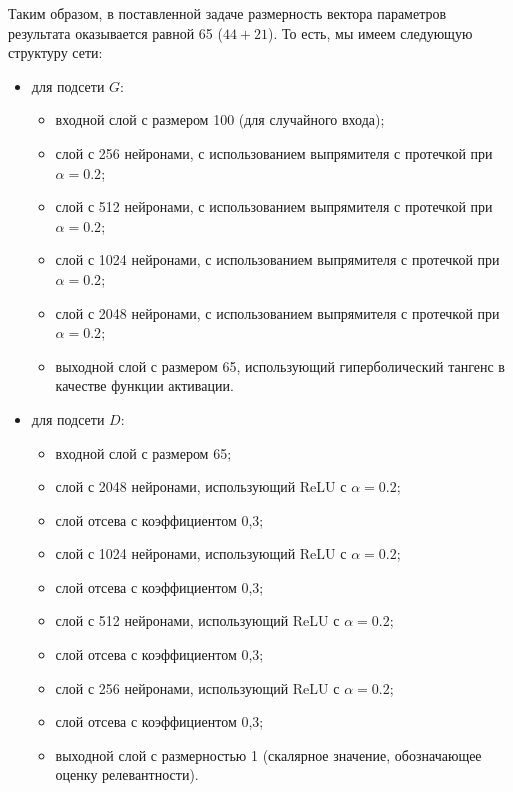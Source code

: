Таким образом, в поставленной задаче размерность вектора параметров результата оказывается равной 65 ($44+21$). То есть, мы имеем следующую
структуру сети:
\begin{itemize}
    \item для подсети $G$:
          \begin{itemize}
              \item входной слой с размером 100 (для случайного
                    входа);
              \item слой с 256 нейронами, с использованием выпрямителя с протечкой при $\alpha = 0.2$;
              \item слой с 512 нейронами, с использованием выпрямителя с протечкой при $\alpha = 0.2$;
              \item слой с 1024 нейронами, с использованием выпрямителя с протечкой при $\alpha = 0.2$;
              \item слой с 2048 нейронами, с использованием выпрямителя с протечкой при $\alpha = 0.2$;
              \item выходной слой с размером 65, использующий гиперболический тангенс в качестве функции активации.
          \end{itemize}
    \item для подсети $D$:
          \begin{itemize}
              \item входной слой с размером 65;
              \item слой с 2048 нейронами, использующий ReLU с $\alpha = 0.2$;
              \item слой отсева с коэффициентом 0,3;
              \item слой с 1024 нейронами, использующий ReLU с $\alpha = 0.2$;
              \item слой отсева с коэффициентом 0,3;
              \item слой с 512 нейронами, использующий ReLU с $\alpha = 0.2$;
              \item слой отсева с коэффициентом 0,3;
              \item слой с 256 нейронами, использующий ReLU с $\alpha = 0.2$;
              \item слой отсева с коэффициентом 0,3;
              \item выходной слой с размерностью 1 (скалярное значение, обозначающее оценку релевантности).
          \end{itemize}
\end{itemize}


